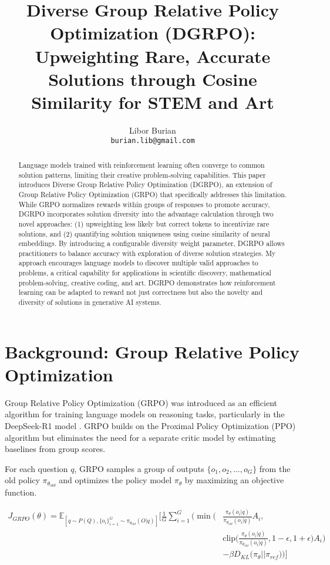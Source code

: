 \documentclass[10pt,twocolumn,letterpaper]{article}
\title{Diverse Group Relative Policy Optimization (DGRPO): Upweighting Rare, Accurate Solutions through Cosine Similarity for STEM and Art}
\author{
  Libor Burian\\
  \texttt{burian.lib@gmail.com}\\
}
\begin{document}
\maketitle

\begin{abstract}
Language models trained with reinforcement learning often converge to common solution patterns, limiting their creative problem-solving capabilities. This paper introduces Diverse Group Relative Policy Optimization (DGRPO), an extension of Group Relative Policy Optimization (GRPO) that specifically addresses this limitation. While GRPO normalizes rewards within groups of responses to promote accuracy, DGRPO incorporates solution diversity into the advantage calculation through two novel approaches: (1) upweighting less likely but correct tokens to incentivize rare solutions, and (2) quantifying solution uniqueness using cosine similarity of neural embeddings. By introducing a configurable diversity weight parameter, DGRPO allows practitioners to balance accuracy with exploration of diverse solution strategies. My approach encourages language models to discover multiple valid approaches to problems, a critical capability for applications in scientific discovery, mathematical problem-solving, creative coding, and art. DGRPO demonstrates how reinforcement learning can be adapted to reward not just correctness but also the novelty and diversity of solutions in generative AI systems.
\end{abstract}

\section{Background: Group Relative Policy Optimization}
Group Relative Policy Optimization (GRPO) was introduced as an efficient algorithm for training language models on reasoning tasks, particularly in the DeepSeek-R1 model \citep{shao2024deepseek}. GRPO builds on the Proximal Policy Optimization (PPO) algorithm but eliminates the need for a separate critic model by estimating baselines from group scores.

For each question $q$, GRPO samples a group of outputs $\{o_1, o_2, \ldots, o_G\}$ from the old policy $\pi_{\theta_{old}}$ and optimizes the policy model $\pi_\theta$ by maximizing an objective function.

\begin{figure*}[t]
\begin{equation*}
\begin{split}
J_{GRPO}(\theta) = \mathbb{E}_{[q \sim P(Q), \{o_i\}_{i=1}^G \sim \pi_{\theta_{old}}(O|q)]} \Bigg[ \frac{1}{G} \sum_{i=1}^G \Bigg( 
\min \Bigg( & \frac{\pi_\theta(o_i|q)}{\pi_{\theta_{old}}(o_i|q)} A_i, \\
& \text{clip} \Bigg( \frac{\pi_\theta(o_i|q)}{\pi_{\theta_{old}}(o_i|q)}, 1-\epsilon, 1+\epsilon \Bigg) A_i \Bigg) \\
& - \beta D_{KL} \big( \pi_\theta || \pi_{ref} \big) \Bigg) \Bigg]
\end{split}
\end{equation*}
\label{eq:grpo}
\end{figure*}
\end{document}
